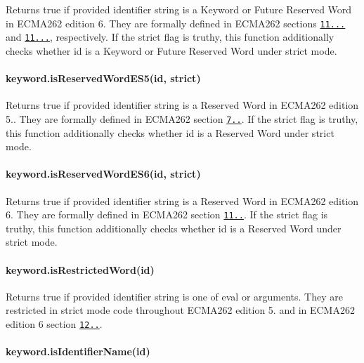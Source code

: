 Returns {\ttfamily true} if provided identifier string is a Keyword or Future Reserved Word in E\+C\+M\+A262 edition 6. They are formally defined in E\+C\+M\+A262 sections \href{https://people.mozilla.org/~jorendorff/es6-draft.html#sec-keywords}{\tt 11...} and \href{https://people.mozilla.org/~jorendorff/es6-draft.html#sec-future-reserved-words}{\tt 11...}, respectively. If the {\ttfamily strict} flag is truthy, this function additionally checks whether {\ttfamily id} is a Keyword or Future Reserved Word under strict mode.

\paragraph*{keyword.\+is\+Reserved\+Word\+E\+S5(id, strict)}

Returns {\ttfamily true} if provided identifier string is a Reserved Word in E\+C\+M\+A262 edition 5.. They are formally defined in E\+C\+M\+A262 section \href{http://es5.github.io/#x7.6.1}{\tt 7..}. If the {\ttfamily strict} flag is truthy, this function additionally checks whether {\ttfamily id} is a Reserved Word under strict mode.

\paragraph*{keyword.\+is\+Reserved\+Word\+E\+S6(id, strict)}

Returns {\ttfamily true} if provided identifier string is a Reserved Word in E\+C\+M\+A262 edition 6. They are formally defined in E\+C\+M\+A262 section \href{https://people.mozilla.org/~jorendorff/es6-draft.html#sec-reserved-words}{\tt 11..}. If the {\ttfamily strict} flag is truthy, this function additionally checks whether {\ttfamily id} is a Reserved Word under strict mode.

\paragraph*{keyword.\+is\+Restricted\+Word(id)}

Returns {\ttfamily true} if provided identifier string is one of {\ttfamily eval} or {\ttfamily arguments}. They are restricted in strict mode code throughout E\+C\+M\+A262 edition 5. and in E\+C\+M\+A262 edition 6 section \href{https://people.mozilla.org/~jorendorff/es6-draft.html#sec-identifiers-static-semantics-early-errors}{\tt 12..}.

\paragraph*{keyword.\+is\+Identifier\+Name(id)}

